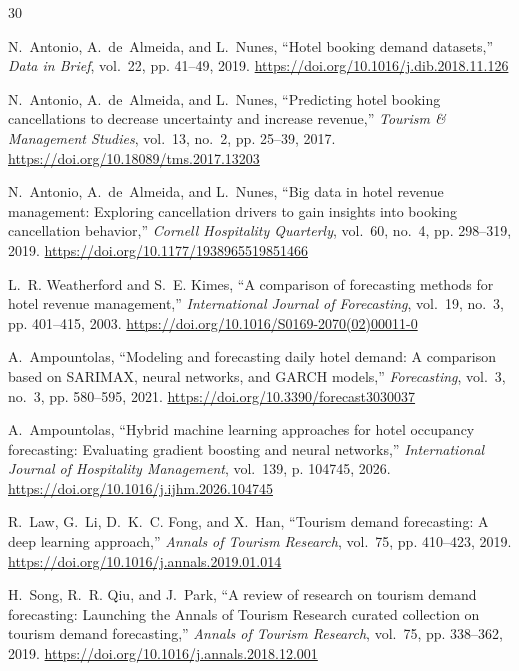 \documentclass[11pt,a4paper]{article}
\begin{document}

\begin{thebibliography}{30}

N.~Antonio, A.~de~Almeida, and L.~Nunes, ``Hotel booking demand datasets,'' \emph{Data in Brief}, vol.~22, pp. 41--49, 2019. \url{https://doi.org/10.1016/j.dib.2018.11.126}

N.~Antonio, A.~de~Almeida, and L.~Nunes, ``Predicting hotel booking cancellations to decrease uncertainty and increase revenue,'' \emph{Tourism \& Management Studies}, vol.~13, no.~2, pp. 25--39, 2017. \url{https://doi.org/10.18089/tms.2017.13203}

N.~Antonio, A.~de~Almeida, and L.~Nunes, ``Big data in hotel revenue management: Exploring cancellation drivers to gain insights into booking cancellation behavior,'' \emph{Cornell Hospitality Quarterly}, vol.~60, no.~4, pp. 298--319, 2019. \url{https://doi.org/10.1177/1938965519851466}

L.~R. Weatherford and S.~E. Kimes, ``A comparison of forecasting methods for hotel revenue management,'' \emph{International Journal of Forecasting}, vol.~19, no.~3, pp. 401--415, 2003. \url{https://doi.org/10.1016/S0169-2070(02)00011-0}

A.~Ampountolas, ``Modeling and forecasting daily hotel demand: A comparison based on SARIMAX, neural networks, and GARCH models,'' \emph{Forecasting}, vol.~3, no.~3, pp. 580--595, 2021. \url{https://doi.org/10.3390/forecast3030037}

A.~Ampountolas, ``Hybrid machine learning approaches for hotel occupancy forecasting: Evaluating gradient boosting and neural networks,'' \emph{International Journal of Hospitality Management}, vol.~139, p. 104745, 2026. \url{https://doi.org/10.1016/j.ijhm.2026.104745}

R.~Law, G.~Li, D.~K.~C. Fong, and X.~Han, ``Tourism demand forecasting: A deep learning approach,'' \emph{Annals of Tourism Research}, vol.~75, pp. 410--423, 2019. \url{https://doi.org/10.1016/j.annals.2019.01.014}

H.~Song, R.~R. Qiu, and J.~Park, ``A review of research on tourism demand forecasting: Launching the Annals of Tourism Research curated collection on tourism demand forecasting,'' \emph{Annals of Tourism Research}, vol.~75, pp. 338--362, 2019. \url{https://doi.org/10.1016/j.annals.2018.12.001}


\end{thebibliography}
\end{document}

